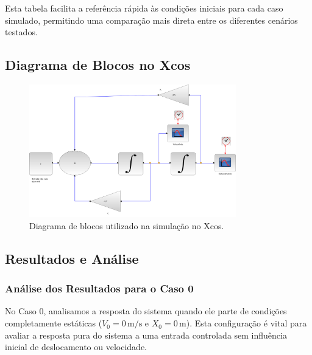 Esta tabela facilita a referência rápida às condições iniciais para cada caso simulado, permitindo uma comparação mais direta entre os diferentes cenários testados.

\subsection{Diagrama de Blocos no Xcos}
\begin{figure}[H]
    \centering
    \includegraphics[width=0.8\textwidth]{atividades/2-atividade/assets/diagrama.png}
    \caption{Diagrama de blocos utilizado na simulação no Xcos.}
\end{figure}

\subsection{Resultados e Análise}


\subsubsection{Análise dos Resultados para o Caso 0}
No Caso 0, analisamos a resposta do sistema quando ele parte de condições completamente estáticas (\(V_0 = 0 \, \text{m/s}\) e \(X_0 = 0 \, \text{m}\)). Esta configuração é vital para avaliar a resposta pura do sistema a uma entrada controlada sem influência inicial de deslocamento ou velocidade.

